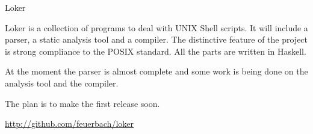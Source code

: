 \begin{hcarentry}{Loker}
\makeheader

Loker is a collection of programs to deal with UNIX Shell scripts.
It will include a parser, a static analysis tool and a compiler. The distinctive
feature of the project is strong compliance to the POSIX standard. All the parts
are written in Haskell.

At the moment the parser is almost complete and some work is being done on the
analysis tool and the compiler.

The plan is to make the first release soon.

\FurtherReading
  \url{http://github.com/feuerbach/loker}
\end{hcarentry}
